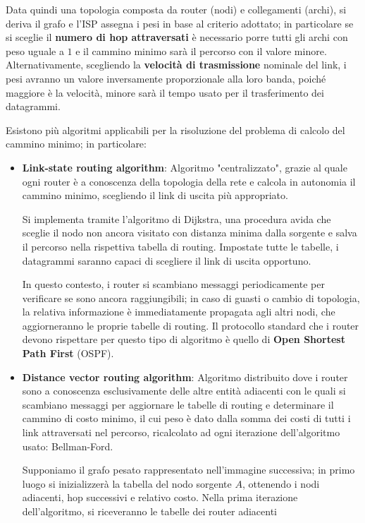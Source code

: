 \noindent Data quindi una topologia composta da router (nodi) e collegamenti (archi), si deriva il grafo e l'ISP assegna i pesi in base al criterio
adottato; in particolare se si sceglie il \textbf{numero di hop attraversati} è necessario porre tutti gli archi con peso uguale a $1$ e il cammino
minimo sarà il percorso con il valore minore. Alternativamente, scegliendo la \textbf{velocità di trasmissione} nominale del link, i pesi avranno un
valore inversamente proporzionale alla loro banda, poiché maggiore è la velocità, minore sarà il tempo usato per il trasferimento dei datagrammi.\par
Esistono più algoritmi applicabili per la risoluzione del problema di calcolo del cammino minimo; in particolare: \begin{itemize}
	\item \textbf{Link-state routing algorithm}: Algoritmo "centralizzato", grazie al quale ogni router è a conoscenza della topologia della rete e
	calcola in autonomia il cammino minimo, scegliendo il link di uscita più appropriato.\par
	Si implementa tramite l'algoritmo di Dijkstra, una procedura avida che sceglie il nodo non ancora visitato con distanza minima dalla sorgente
	e salva il percorso nella rispettiva tabella di routing. Impostate tutte le tabelle, i datagrammi saranno capaci di scegliere il link di uscita
	opportuno.\par
	In questo contesto, i router si scambiano messaggi periodicamente per verificare se sono ancora raggiungibili; in caso di guasti o cambio di
	topologia, la relativa informazione è immediatamente propagata agli altri nodi, che aggiorneranno le proprie tabelle di routing. Il protocollo
	standard che i router devono rispettare per questo tipo di algoritmo è quello di \textbf{Open Shortest Path First} (OSPF).
	\item \textbf{Distance vector routing algorithm}: Algoritmo distribuito dove i router sono a conoscenza esclusivamente delle altre entità adiacenti
	con le quali si scambiano messaggi per aggiornare le tabelle di routing e determinare il cammino di costo minimo, il cui peso è dato dalla somma
	dei costi di tutti i link attraversati nel percorso, ricalcolato ad ogni iterazione dell'algoritmo usato: Bellman-Ford.\par
	Supponiamo il grafo pesato rappresentato nell'immagine successiva; in primo luogo si inizializzerà la tabella del nodo sorgente $A$, ottenendo i 
	nodi adiacenti, hop successivi e relativo costo. Nella prima iterazione dell'algoritmo, si riceveranno le tabelle dei router adiacenti

\end{itemize}
